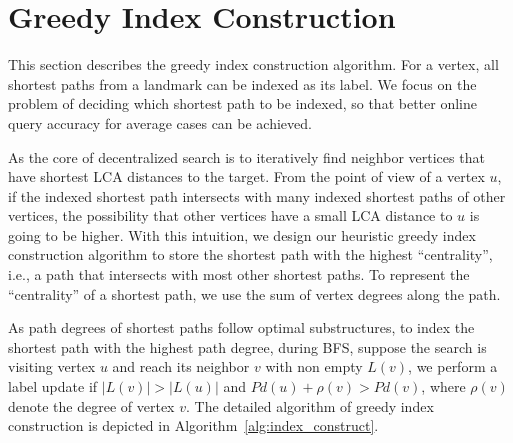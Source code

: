 \section{Greedy Index Construction}
\label{preprocessing}

This section describes the greedy index construction algorithm. For a vertex, all shortest paths from a landmark can be indexed as its label. We focus on the problem of deciding which shortest path to be indexed, so that better online query accuracy for average cases can be achieved. 


As the core of decentralized search is to iteratively find neighbor vertices that have shortest LCA distances to the target. From the point of view of a vertex $u$, if the indexed shortest path intersects with many indexed shortest paths of other vertices, the possibility that other vertices have a small LCA distance to $u$ is going to be higher. With this intuition, we design our heuristic greedy index construction algorithm to store the shortest path with the highest ``centrality'', i.e., a path that intersects with most other shortest paths. To represent the ``centrality'' of a shortest path, we use the sum of vertex degrees along the path. %

As path degrees of shortest paths follow optimal substructures, 
to index the shortest path with the highest path degree, during BFS, suppose the search is visiting vertex $u$ and reach its neighbor $v$ with non empty $L(v)$, we perform a label update if $|L(v)| > |L(u)|$ and $Pd(u) + \rho(v) > Pd(v)$, where $\rho(v)$ denote the degree of vertex $v$. The detailed algorithm of greedy index construction is depicted in Algorithm~\ref{alg:index_construct}. 

